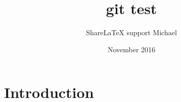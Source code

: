 \documentclass{article}
\title{git test}
\author{ShareLaTeX support Michael}
\date{November 2016}
\begin{document}
\maketitle

\section{Introduction}
\end{document}
